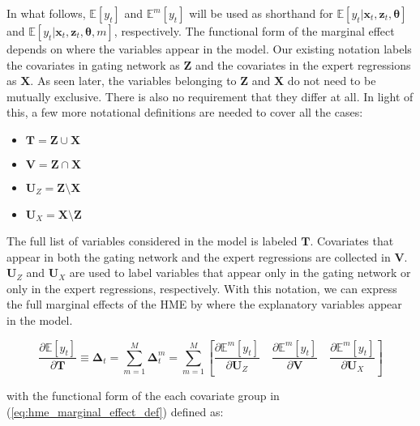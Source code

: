 \documentclass[12pt]{article}
\newcommand{\Eym}{\mathbb{E}^{m} \left[ y_{t} \right]}
\theoremstyle{definition}
\begin{document}
In what follows, $\mathbb{E} \left[y_{t}\right]$ and $\Eym$ will be used as shorthand for $\mathbb{E} \left[ y_{t} | \boldsymbol{x}_{t}, \boldsymbol{z}_{t}, \boldsymbol{\theta} \right]$ and $\mathbb{E} \left[ y_{t} | \boldsymbol{x}_{t}, \boldsymbol{z}_{t}, \boldsymbol{\theta}, m \right]$, respectively. The functional form of the marginal effect depends on where the variables appear in the model. Our existing notation labels the covariates in gating network as $\boldsymbol{Z}$ and the covariates in the expert regressions as $\boldsymbol{X}$. As seen later, the variables belonging to $\boldsymbol{Z}$ and $\boldsymbol{X}$ do not need to be mutually exclusive. There is also no requirement that they differ at all. In light of this, a few more notational definitions are needed to cover all the cases:

\begin{itemize}  
  \item $\boldsymbol{T} = \boldsymbol{Z} \cup \boldsymbol{X}$
  \item $\boldsymbol{V} = \boldsymbol{Z} \cap \boldsymbol{X}$
  \item $\boldsymbol{U}_{Z} = \boldsymbol{Z} \setminus \boldsymbol{X}$
  \item $\boldsymbol{U}_{X} = \boldsymbol{X} \setminus \boldsymbol{Z}$
\end{itemize}


The full list of variables considered in the model is labeled $\boldsymbol{T}$. Covariates that appear in both the gating network and the expert regressions are collected in $\boldsymbol{V}$. $\boldsymbol{U}_{Z}$ and $\boldsymbol{U}_{X}$ are used to label variables that appear only in the gating network or only in the expert regressions, respectively. With this notation, we can express the full marginal effects of the HME by where the explanatory variables appear in the model.

\begin{equation} \label{eq:hme_marginal_effect_def}
  \frac{\partial \mathbb{E} \left[y_{t}\right]}{\partial \boldsymbol{T}} \equiv \boldsymbol{\Delta}_{t} = \sum_{m=1}^{M} \boldsymbol{\Delta}^{m}_{t} = \sum_{m=1}^{M} \left[ \frac{\partial \Eym}{\partial \boldsymbol{U}_{Z}}   \quad   \frac{\partial \Eym}{\partial \boldsymbol{V}}   \quad   \frac{\partial \Eym}{\partial \boldsymbol{U}_{X}}   \right]
\end{equation}

with the functional form of the each covariate group in (\ref{eq:hme_marginal_effect_def}) defined as:
\end{document}
